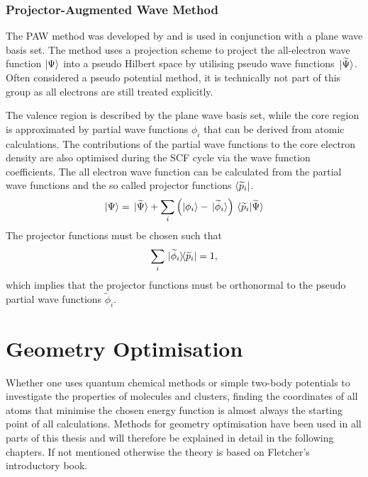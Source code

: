 \subsection{Projector-Augmented Wave Method}
\label{sec:PAW}

The \ac{PAW} method was developed by
\citeauthor{Blochl_Projectoraugmentedwavemethod_1994}\autocite{Blochl_Projectoraugmentedwavemethod_1994}
and is used in conjunction with a plane wave basis set. The method uses a
projection scheme to project the all-electron wave function $\ket{\Psi}$ into a
pseudo Hilbert space by utilising pseudo wave functions
$\ket*{\widetilde{\Psi}}$. Often considered a pseudo potential method, it is
technically not part of this group as all electrons are still treated
explicitly.

The valence region is described by the plane wave basis set, while the core
region is approximated by partial wave functions $\phi_i$ that can be derived
from atomic calculations. The contributions of the partial wave functions to
the core electron density are also optimised during the \ac{SCF} cycle via the
wave function coefficients. The all electron wave function can be calculated
from the partial wave functions and the so called projector functions
$\bra{\widetilde{p}_i}$.
%
\begin{align}
    \ket{\Psi} = \ket*{\widetilde{\Psi}} + \sum_i\left(\ket{\phi_i}-\ket*{\widetilde{\phi}_i}\right)\braket*{\widetilde{p}_i}{\widetilde{\Psi}}
\end{align}
%
The projector functions must be chosen such that
%
\begin{align}
    \sum_i\dyad*{\widetilde{\phi}_i}{\widetilde{p}_i} = 1,
\end{align}
%
which implies that the projector functions must be orthonormal to the pseudo
partial wave functions $\widetilde{\phi}_i$.

\chapter{Geometry Optimisation}
\label{sec:geometryoptimisation}

Whether one uses quantum chemical methods or simple two-body potentials to
investigate the properties of molecules and clusters, finding the coordinates
of all atoms that minimise the chosen energy function is almost always the
starting point of all calculations.  Methods for geometry optimisation have
been used in all parts of this thesis and will therefore be explained in detail
in the following chapters. If not mentioned otherwise the theory is based on
Fletcher's\autocite{Fletcher_Practicalmethodsoptimization_1987} introductory
book.

